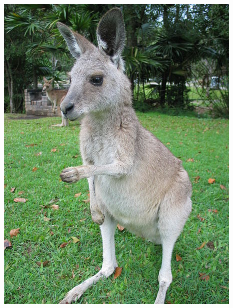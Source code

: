 \begin{center}
\begin{minipage}{0.26\textwidth}
\includegraphics[width=\textwidth]{images/Kangaroo_ST_03}
\end{minipage}
\begin{minipage}{0.24\textwidth}

\end{minipage}
\end{center}
